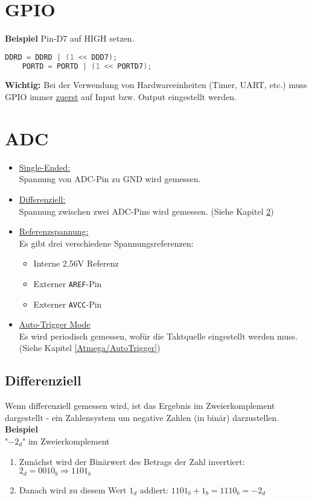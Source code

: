\section{GPIO}


\textbf{Beispiel}
Pin-D7 auf HIGH setzen.
\begin{lstlisting}[language=C]
    DDRD = DDRD | (1 << DDD7);
    PORTD = PORTD | (1 << PORTD7);
\end{lstlisting}

\textbf{Wichtig:} Bei der Verwendung von Hardwareeinheiten (Timer, UART, etc.) muss GPIO immer \underline{zuerst} auf Input bzw. Output eingestellt werden.

\section{ADC}
\begin{itemize}
    \item \underline{Single-Ended:} \\
    Spannung von ADC-Pin zu GND wird gemessen.
    \item \underline{Differenziell:} \\
    Spannung zwischen zwei ADC-Pins wird gemessen. (Siehe Kapitel \ref{})
    \item \underline{Referenzspannung:} \\
    Es gibt drei verschiedene Spannungsreferenzen:
    \begin{itemize}
        \item Interne 2,56V Referenz
        \item Externer \verb|AREF|-Pin
        \item Externer \verb|AVCC|-Pin
    \end{itemize}
    \item \underline{Auto-Trigger Mode} \\
    Es wird periodisch gemessen, wofür die Taktquelle eingestellt werden muss. (Siehe Kapitel \ref{Atmega/AutoTrigger})
\end{itemize}

\subsection{Differenziell} \label{Atmega/Differenziell}
Wenn differenziell gemessen wird, ist das Ergebnis im Zweierkomplement dargestellt - ein Zahlensystem um negative Zahlen (in binär) darzustellen.
\textbf{Beispiel} \\
"$-2_d$" im Zweierkomplement \\
\begin{enumerate}
    \item Zunächst wird der Binärwert des Betrags der Zahl invertiert: $2_d=0010_b\Rightarrow 1101_b$ \\
    \item Danach wird zu diesem Wert $1_d$ addiert: $1101_b + 1_b = 1110_b = -2_d$
\end{enumerate}

